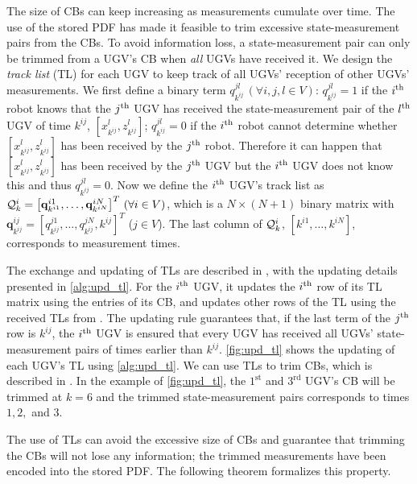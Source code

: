 	
	The size of CBs can keep increasing as measurements cumulate over time. 
	\textcolor{\revcol}{The use of the stored PDF has made it feasible to trim excessive state-measurement pairs from the CBs.}
	To avoid information loss, a state-measurement pair can only be trimmed from a UGV's CB when \textit{all} UGVs have received it.
	\textcolor{\revcol}{We design the \textit{track list} (TL) for each UGV to keep track of all UGVs' reception of other UGVs' measurements.
	We first define a binary term $q^{jl}_{k^{ij}}\,(\forall i,j,l\in V)$: $q^{jl}_{k^{ij}}=1$ if the $i^\text{th}$ robot knows that the $j^\text{th}$ UGV has received the state-measurement pair of the $l^\text{th}$ UGV of time $k^{ij}$, $\left[x^l_{k^{ij}},z^l_{k^{ij}}\right]$; $q^{jl}_{k^{ij}}=0$ if the $i^\text{th}$ robot cannot determine whether $\left[x^l_{k^{ij}},z^l_{k^{ij}}\right]$ has been received by the $j^\text{th}$ robot.}
	Therefore \textcolor{\revcol}{it can happen that $\left[x^l_{k^{ij}},z^l_{k^{ij}}\right]$ has been received by the $j^\text{th}$ UGV but the $i^\text{th}$ UGV does not know this and thus $q^{jl}_{k^{ij}}=0$.
	Now we define the $i^\text{th}$ UGV's track list as $\mathcal{Q}^i_k=\left[\mathbf{q}^{i1}_{k^{i1}},\dots, \mathbf{q}^{iN}_{k^{iN}}\right]^T \,(\forall i\in V)$, which is a $N\times (N+1)$ binary matrix with
	$\mathbf{q}^{ij}_{k^{ij}}=\left[q^{j1}_{k^{ij}},\dots,q^{jN}_{k^{ij}},k^{ij}\right]^T$ ($j\in V$).
	The last column of $\mathcal{Q}^i_k$, $\left[k^{i1},\dots,k^{iN}\right]$, corresponds to measurement times.}
	
	The exchange and updating of TLs are described in , with the updating details presented in \cref{alg:upd_tl}.
	For the $i^\text{th}$ UGV, it updates the $i^\text{th}$ row of its TL matrix using the entries of its CB, and updates other rows of the TL using the received TLs from {\inbhd}.
	The updating rule guarantees that, if the last term of the $j^\text{th}$ row is $k^{ij}$, \textcolor{\revcol}{the $i^\text{th}$ UGV is ensured that every UGV has received all UGVs' state-measurement pairs of times earlier than $k^{ij}$.
	\cref{fig:upd_tl} shows the updating of each UGV's TL using \cref{alg:upd_tl}.
	We can use TLs to trim CBs, which is described in .}
	In the example of \cref{fig:upd_tl}, the $1^\text{st}$ and $3^\text{rd}$ UGV's CB will be trimmed at $k=6$ and the trimmed state-measurement pairs corresponds to times $1,2,$ and $3$.
	
	The use of TLs can avoid the excessive size of CBs and guarantee that trimming the CBs will not lose any information; the trimmed measurements have been encoded into the stored PDF.
	The following theorem formalizes this property.
	
